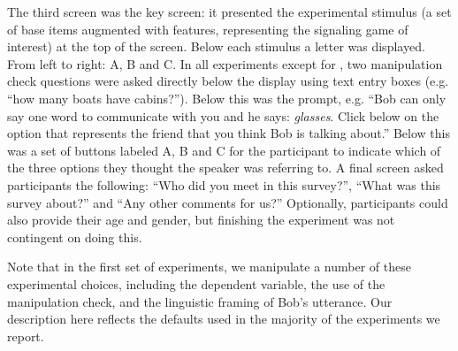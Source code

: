 The third screen was the key screen: it presented the experimental stimulus (a set of base items augmented with features, representing the signaling game of interest) at the top of the screen. Below each stimulus a letter was displayed. From left to right: A, B and C. In all experiments except for , two manipulation check questions were asked directly below the display using text entry boxes (e.g. ``how many boats have cabins?''). Below this was the prompt, e.g. ``Bob can only say one word to communicate with you and he says: {\it glasses}. Click below on the option that represents the friend that you think Bob is talking about.'' Below this was a set of buttons labeled A, B and C for the participant to indicate which of the three options they thought the speaker was referring to. A final screen asked participants the following: ``Who did you meet in this survey?'',  ``What was this survey about?'' and ``Any other comments for us?'' Optionally, participants could also provide their age and gender, but finishing the experiment was not contingent on doing this.

Note that in the first set of experiments, we manipulate a number of these experimental choices, including the dependent variable, the use of the manipulation check, and the linguistic framing of Bob's utterance. Our description here reflects the defaults used in the majority of the experiments we report. 






